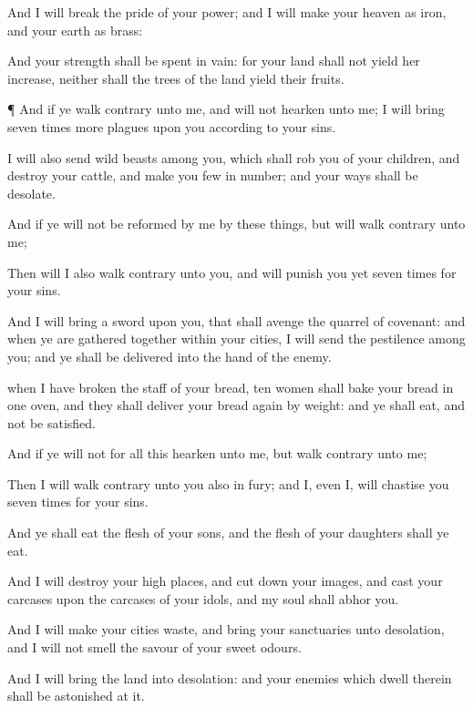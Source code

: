{And I will
break the
pride of your
power; and I will
make your
heaven as
iron, and your
earth as
brass:

And your
strength shall be
spent in
vain: for your
land shall not
yield her
increase, neither shall the
trees of the
land
yield their
fruits.


\par }{\PP {}¶ And if ye
walk
contrary unto me, and
will not
hearken unto me; I will
bring seven
times
more
plagues upon you according to your
sins.

I will also
send
wild
beasts among you, which shall rob you of your
children, and
destroy your
cattle, and make you few in
number; and your
{}
ways shall be
desolate.

And if ye will not be
reformed by me by these things, but will
walk
contrary unto me;

Then will I also
walk
contrary unto you, and will
punish you
yet seven
times for your
sins.

And I will
bring a
sword upon you, that shall
avenge the
quarrel of
{}
covenant: and when ye are gathered
together
within your
cities, I will
send the
pestilence
among you; and ye shall be
delivered into the
hand of the
enemy.

 when I have
broken the
staff of your
bread,
ten
women shall
bake your
bread in
one
oven, and they shall
deliver
{} your
bread
again by
weight: and ye shall
eat, and not be
satisfied.

And if ye will not for all
this
hearken unto me, but
walk
contrary unto me;

Then I will
walk
contrary unto you also in
fury; and I,
even I, will
chastise you seven
times for your
sins.

And ye shall
eat the
flesh of your
sons, and the
flesh of your
daughters shall ye
eat.

And I will
destroy your high
places, and cut
down your
images, and
cast your
carcases upon the
carcases of your
idols, and my
soul shall
abhor you.

And I will
make your
cities
waste, and
bring your
sanctuaries unto
desolation, and I will not
smell the
savour of your sweet
odours.

And I will
bring the
land into
desolation: and your
enemies which
dwell therein shall be
astonished at it.

}
